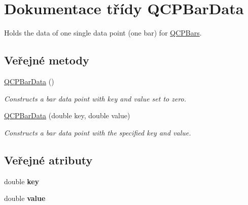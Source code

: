 \hypertarget{classQCPBarData}{}\section{Dokumentace třídy Q\+C\+P\+Bar\+Data}
\label{classQCPBarData}


Holds the data of one single data point (one bar) for \hyperlink{classQCPBars}{Q\+C\+P\+Bars}.  


\subsection*{Veřejné metody}
\begin{DoxyCompactItemize}
\item 
\hypertarget{classQCPBarData_a8d214eda9ef41bc6da2a908a09623836}{}\hyperlink{classQCPBarData_a8d214eda9ef41bc6da2a908a09623836}{Q\+C\+P\+Bar\+Data} ()\label{classQCPBarData_a8d214eda9ef41bc6da2a908a09623836}

\begin{DoxyCompactList}\small\item\em Constructs a bar data point with key and value set to zero. \end{DoxyCompactList}\item 
\hypertarget{classQCPBarData_ac0bb7ede5373a7b18713418fa78f972d}{}\hyperlink{classQCPBarData_ac0bb7ede5373a7b18713418fa78f972d}{Q\+C\+P\+Bar\+Data} (double key, double value)\label{classQCPBarData_ac0bb7ede5373a7b18713418fa78f972d}

\begin{DoxyCompactList}\small\item\em Constructs a bar data point with the specified {\itshape key} and {\itshape value}. \end{DoxyCompactList}\end{DoxyCompactItemize}
\subsection*{Veřejné atributy}
\begin{DoxyCompactItemize}
\item 
\hypertarget{classQCPBarData_afe544b035ef19027ea3d65adeaf81b42}{}double {\bfseries key}\label{classQCPBarData_afe544b035ef19027ea3d65adeaf81b42}

\item 
\hypertarget{classQCPBarData_acab57005d8916d61b64e9ddef6113b60}{}double {\bfseries value}\label{classQCPBarData_acab57005d8916d61b64e9ddef6113b60}

\end{DoxyCompactItemize}


